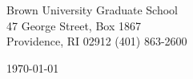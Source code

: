\begin{minipage}{0.49\textwidth}
\begin{flushleft}
\noindent
Brown University Graduate School \\
47 George Street, Box 1867 \\
Providence, RI 02912 (401) 863-2600
\end{flushleft}
\end{minipage}
\begin{minipage}{0.47\textwidth}
\begin{flushright}
\today
\end{flushright}
\end{minipage} \\

\newcommand{\univ}{Brown University}
\newcommand{\univshort}{Brown}
\newcommand{\degree}{Ph.D.}
\newcommand{\dept}{Computer Science}
